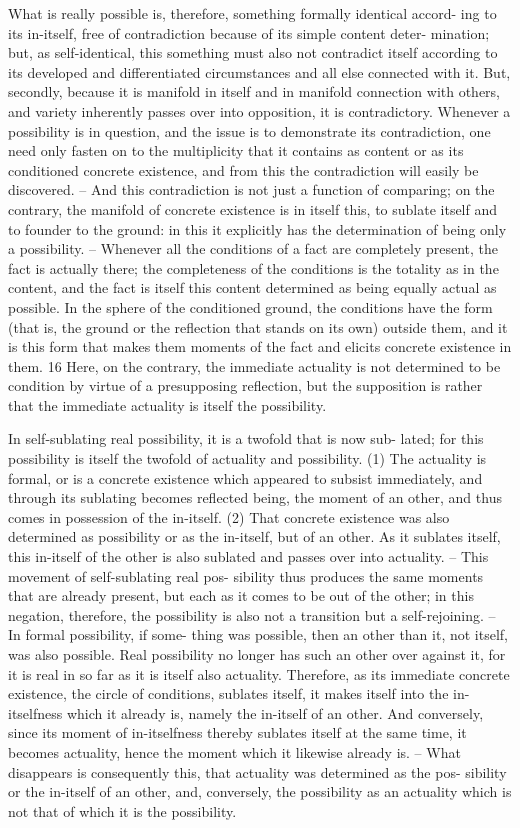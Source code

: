 What is really possible is, therefore, something formally identical accord-
ing to its in-itself, free of contradiction because of its simple content deter-
mination; but, as self-identical, this something must also not contradict
itself according to its developed and differentiated circumstances and all
else connected with it. But, secondly, because it is manifold in itself and in
manifold connection with others, and variety inherently passes over into
opposition, it is contradictory. Whenever a possibility is in question, and
the issue is to demonstrate its contradiction, one need only fasten on to
the multiplicity that it contains as content or as its conditioned concrete
existence, and from this the contradiction will easily be discovered. – And
this contradiction is not just a function of comparing; on the contrary, the
manifold of concrete existence is in itself this, to sublate itself and to founder
to the ground: in this it explicitly has the determination of being only a
possibility. – Whenever all the conditions of a fact are completely present,
the fact is actually there; the completeness of the conditions is the totality
as in the content, and the fact is itself this content determined as being
equally actual as possible. In the sphere of the conditioned ground, the
conditions have the form (that is, the ground or the reflection that stands
on its own) outside them, and it is this form that makes them moments
of the fact and elicits concrete existence in them. 16 Here, on the contrary,
the immediate actuality is not determined to be condition by virtue of a
presupposing reflection, but the supposition is rather that the immediate
actuality is itself the possibility.

In self-sublating real possibility, it is a twofold that is now sub-
lated; for this possibility is itself the twofold of actuality and possibility.
(1) The actuality is formal, or is a concrete existence which appeared to
subsist immediately, and through its sublating becomes reflected being, the
moment of an other, and thus comes in possession of the in-itself. (2) That
concrete existence was also determined as possibility or as the in-itself, but
of an other. As it sublates itself, this in-itself of the other is also sublated
and passes over into actuality. – This movement of self-sublating real pos-
sibility thus produces the same moments that are already present, but each as
it comes to be out of the other; in this negation, therefore, the possibility
is also not a transition but a self-rejoining. – In formal possibility, if some-
thing was possible, then an other than it, not itself, was also possible. Real
possibility no longer has such an other over against it, for it is real in so
far as it is itself also actuality. Therefore, as its immediate concrete existence,
the circle of conditions, sublates itself, it makes itself into the in-itselfness
which it already is, namely the in-itself of an other. And conversely, since
its moment of in-itselfness thereby sublates itself at the same time, it
becomes actuality, hence the moment which it likewise already is. – What
disappears is consequently this, that actuality was determined as the pos-
sibility or the in-itself of an other, and, conversely, the possibility as an
actuality which is not that of which it is the possibility.

